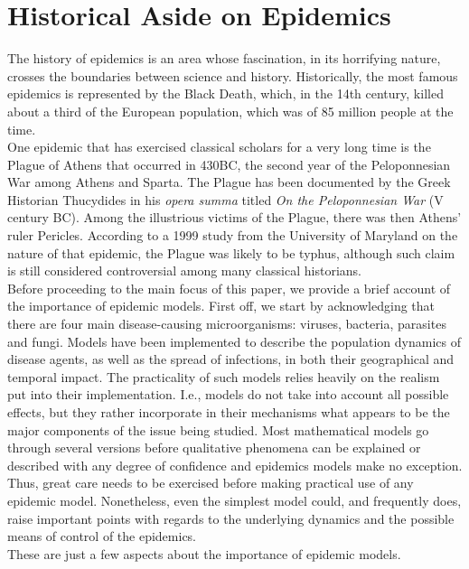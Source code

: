 \section{Historical Aside on Epidemics}

The history of epidemics is an area whose fascination, in its horrifying nature, crosses the boundaries between science and history. Historically, the most famous epidemics is represented by the Black Death, which, in the 14th century, killed about a third of the European population, which was of 85 million people at the time.\\
One epidemic that has exercised classical scholars for a very long time is the Plague of Athens that occurred in 430BC, the second year of the Peloponnesian War among Athens and Sparta. The Plague has been documented by the Greek Historian Thucydides in his \textit{opera summa} titled \textit{On the Peloponnesian War} (V century BC). Among the illustrious victims of the Plague, there was then Athens' ruler Pericles. According to a 1999 study from the University of Maryland on the nature of that epidemic, the Plague was likely to be typhus, although such claim is still considered controversial among many classical historians.\\
Before proceeding to the main focus of this paper, we provide a brief account of the importance of epidemic models.
First off, we start by acknowledging that there are four main disease-causing microorganisms: viruses, bacteria, parasites and fungi. Models have been implemented to describe the population dynamics of disease agents, as well as the spread of infections, in both their geographical and temporal impact. The practicality of such models relies heavily on the realism put into their implementation. I.e., models do not take into account all possible effects, but they rather incorporate in their mechanisms what appears to be the major components of the issue being studied. Most mathematical models go through several versions before qualitative phenomena can be explained or described with any degree of confidence and epidemics models make no exception. Thus, great care needs to be exercised before making practical use of any epidemic model. Nonetheless, even the simplest model could, and frequently does, raise important points with regards to the underlying dynamics and the possible means of control of the epidemics.\\
These are just a few aspects about the importance of epidemic models.

